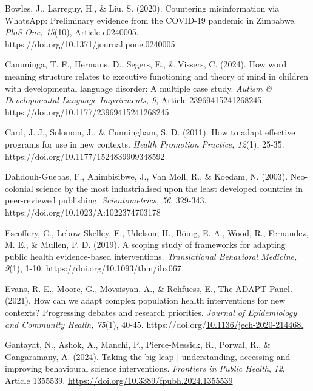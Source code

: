 \documentclass[authordate, empirical]{jote-new-article}
\begin{document}
	Bowles, J., Larreguy, H., \& Liu, S. (2020). Countering misinformation via WhatsApp: Preliminary evidence from the COVID-19 pandemic in Zimbabwe. \emph{PloS One, 15}(10), Article e0240005. https://doi.org/10.1371/journal.pone.0240005



	Camminga, T. F., Hermans, D., Segers, E., \& Vissers, C. (2024). How word meaning structure relates to executive functioning and theory of mind in children with developmental language disorder: A multiple case study. \emph{Autism \& Developmental Language Impairments, 9}, Article 23969415241268245. https://doi.org/10.1177/23969415241268245



	Card, J. J., Solomon, J., \& Cunningham, S. D. (2011). How to adapt effective programs for use in new contexts. \emph{Health Promotion Practice, 12}(1), 25-35. https://doi.org/10.1177/1524839909348592



	Dahdouh-Guebas, F., Ahimbisibwe, J., Van Moll, R., \& Koedam, N. (2003). Neo-colonial science by the most industrialised upon the least developed countries in peer-reviewed publishing. \emph{Scientometrics, 56}, 329-343. https://doi.org/10.1023/A:1022374703178



	Escoffery, C., Lebow-Skelley, E., Udelson, H., Böing, E. A., Wood, R., Fernandez, M. E., \& Mullen, P. D. (2019). A scoping study of frameworks for adapting public health evidence-based interventions. \emph{Translational Behavioral Medicine, 9}(1), 1-10. https://doi.org/10.1093/tbm/ibx067



	Evans, R. E., Moore, G., Movsisyan, A., \& Rehfuess, E., The ADAPT Panel. (2021). How can we adapt complex population health interventions for new contexts? Progressing debates and research priorities. \emph{Journal of Epidemiology and Community Health, 75}(1), 40-45. https://doi.org/\href{https://doi.org/10.1136/jech-2020-214468}{10.1136/jech-2020-214468. }



	Gantayat, N., Ashok, A., Manchi, P., Pierce-Messick, R., Porwal, R., \& Gangaramany, A. (2024). Taking the big leap | understanding, accessing and improving behavioural science interventions. \emph{Frontiers in Public Health}, \emph{12}, Article 1355539. \href{https://doi.org/10.3389/fpubh.2024.1355539%20}{https://doi.org/10.3389/fpubh.2024.1355539 }
\end{document}
